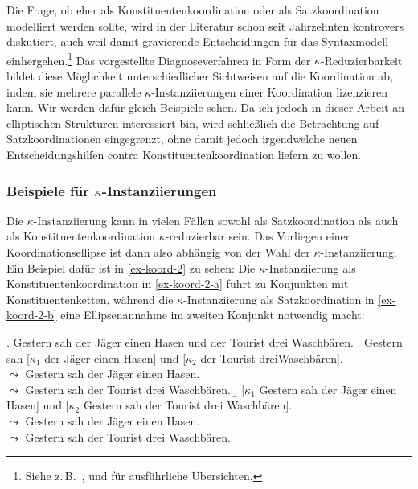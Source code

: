 Die Frage, ob  eher als Konstituentenkoordination oder als Satzkoordination modelliert werden sollte, wird in der Literatur schon seit Jahrzehnten kontrovers diskutiert, auch weil damit gravierende Entscheidungen für das Syntaxmodell einhergehen.\footnote{Siehe z.\,B.\  \citet[Kapitel~1]{Oirsouw:87}, \citet[61ff]{Wilder:97} und \citet[32ff]{Hartmann:00} für ausführliche Übersichten.} Das vorgestellte Diagnoseverfahren in Form der $\kappa$-Reduzierbarkeit bildet diese Möglichkeit unterschiedlicher Sichtweisen auf die Koordination ab, indem sie mehrere parallele $\kappa$-Instanziierungen einer Koordination lizenzieren kann. Wir werden dafür gleich Beispiele sehen. Da ich jedoch in dieser Arbeit an elliptischen Strukturen interessiert bin, wird schlie\ss lich die Betrachtung auf Satzkoordinationen eingegrenzt, ohne damit jedoch irgendwelche neuen Entscheidungshilfen contra Konstituentenkoordination liefern zu wollen. 

\subsubsection*{Beispiele für $\kappa$-Instanziierungen}

Die $\kappa$-Instanziierung kann in vielen Fällen sowohl als Satzkoordination als auch als Konstituentenkoordination $\kappa$-reduzierbar sein. Das Vorliegen einer Koordinationsellipse ist dann also abhängig von der Wahl der $\kappa$-Instanziierung. Ein Beispiel dafür ist in \ref{ex-koord-2} zu sehen: Die $\kappa$-Instanziierung als Konstituentenkoordination in \ref{ex-koord-2-a} führt zu Konjunkten mit Konstituentenketten, während die $\kappa$-Instanziierung als Satzkoordination in \ref{ex-koord-2-b} eine Ellipsenannahme im zweiten Konjunkt notwendig macht: 

\ex. Gestern sah der Jäger einen Hasen und der Tourist drei Waschbären. \label{ex-koord-2}
\a. \label{ex-koord-2-a} Gestern sah [$\kappa_1$ der Jäger einen Hasen] und [$\kappa_2$ der Tourist drei\linebreak Waschbären]. \\
$\leadsto$ Gestern sah der Jäger einen Hasen. \\
$\leadsto$ Gestern sah der Tourist drei Waschbären. 
\b. \label{ex-koord-2-b} [$\kappa_1$ Gestern sah der Jäger einen Hasen] und [$\kappa_2$ \sout{Gestern sah} der Tourist drei Waschbären]. \\
$\leadsto$ Gestern sah der Jäger einen Hasen. \\
$\leadsto$ Gestern sah der Tourist drei Waschbären. 

